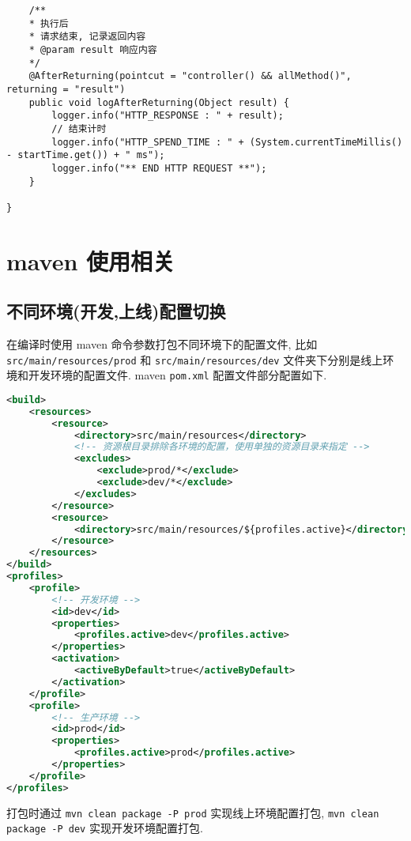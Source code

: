 \begin{lstlisting}
    /**
    * 执行后
    * 请求结束, 记录返回内容
    * @param result 响应内容
    */
    @AfterReturning(pointcut = "controller() && allMethod()", returning = "result")
    public void logAfterReturning(Object result) {
        logger.info("HTTP_RESPONSE : " + result);
        // 结束计时
        logger.info("HTTP_SPEND_TIME : " + (System.currentTimeMillis() - startTime.get()) + " ms");
        logger.info("** END HTTP REQUEST **");
    }

}
\end{lstlisting}

\section{maven 使用相关}\label{maven-ux4f7fux7528ux76f8ux5173}

\subsection{不同环境(开发,上线)配置切换}\label{ux4e0dux540cux73afux5883ux5f00ux53d1ux4e0aux7ebfux914dux7f6eux5207ux6362}

在编译时使用 maven 命令参数打包不同环境下的配置文件, 比如
\lstinline!src/main/resources/prod! 和
\lstinline!src/main/resources/dev!
文件夹下分别是线上环境和开发环境的配置文件. maven \lstinline!pom.xml!
配置文件部分配置如下.

\begin{lstlisting}[language=XML]
<build>
    <resources>
        <resource>
            <directory>src/main/resources</directory>
            <!-- 资源根目录排除各环境的配置，使用单独的资源目录来指定 -->
            <excludes>
                <exclude>prod/*</exclude>
                <exclude>dev/*</exclude>
            </excludes>
        </resource>
        <resource>
            <directory>src/main/resources/${profiles.active}</directory>
        </resource>
    </resources>
</build>
<profiles>
    <profile>
        <!-- 开发环境 -->
        <id>dev</id>
        <properties>
            <profiles.active>dev</profiles.active>
        </properties>
        <activation>
            <activeByDefault>true</activeByDefault>
        </activation>
    </profile>
    <profile>
        <!-- 生产环境 -->
        <id>prod</id>
        <properties>
            <profiles.active>prod</profiles.active>
        </properties>
    </profile>
</profiles>
\end{lstlisting}

打包时通过 \lstinline!mvn clean package -P prod! 实现线上环境配置打包,
\lstinline!mvn clean package -P dev! 实现开发环境配置打包.

